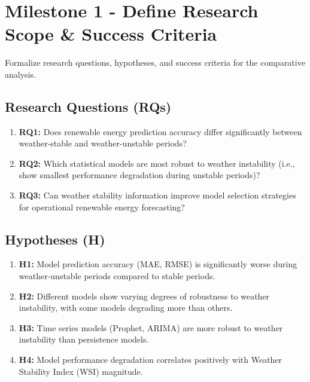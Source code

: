 \documentclass[11pt,a4paper]{article}
\begin{document}
\section{Milestone 1 - Define Research Scope \& Success Criteria}

\begin{objectivebox}
Formalize research questions, hypotheses, and success criteria for the comparative analysis.
\end{objectivebox}

\subsection{Research Questions (RQs)}

\begin{enumerate}
    \item \textbf{RQ1:} Does renewable energy prediction accuracy differ significantly between weather-stable and weather-unstable periods?
    
    \item \textbf{RQ2:} Which statistical models are most robust to weather instability (i.e., show smallest performance degradation during unstable periods)?
    
    \item \textbf{RQ3:} Can weather stability information improve model selection strategies for operational renewable energy forecasting?
\end{enumerate}

\subsection{Hypotheses (H)}

\begin{enumerate}
    \item \textbf{H1:} Model prediction accuracy (MAE, RMSE) is significantly worse during weather-unstable periods compared to stable periods.
    
    \item \textbf{H2:} Different models show varying degrees of robustness to weather instability, with some models degrading more than others.
    
    \item \textbf{H3:} Time series models (Prophet, ARIMA) are more robust to weather instability than persistence models.
    
    \item \textbf{H4:} Model performance degradation correlates positively with Weather Stability Index (WSI) magnitude.
\end{enumerate}
\end{document}
